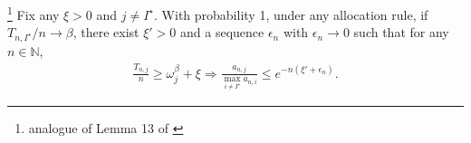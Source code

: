 \begin{lemma}\label{lemma:over_allocation}\footnote{analogue of Lemma 13 of \cite{russo2016ttts}}
Fix any $\xi > 0$ and $j \neq I^\star$. With probability 1, under any allocation rule, if $T_{n,I^\star}/n \rightarrow \beta$, there exist $\xi' > 0$ and a sequence $\epsilon_n$ with $\epsilon_n \rightarrow 0$ such that for any $n \in \mathbb{N}$, 
	\begin{align*}
	\frac{T_{n,j}}{n} \geq \omega_j^\beta + \xi \Rightarrow \frac{a_{n,j}}{\max_{i \neq I^\star} a_{n,i}} \leq e^{-n (\xi' + \epsilon_n)}.
	\end{align*}
\end{lemma}



